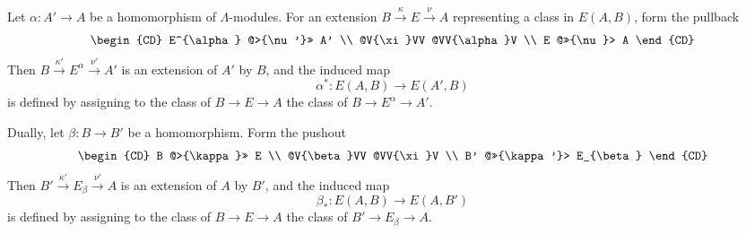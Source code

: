 Let $\alpha: A' \to A$ be a homomorphism of $\Lambda$-modules. For an extension $B \xrightarrow{\kappa} E \xrightarrow{\nu} A$ representing a class in $E(A,B)$, form the pullback
$$
\begin{CD}
E^{\alpha} @>{\nu'}>> A' \\
@V{\xi}VV @VV{\alpha}V \\
E @>>{\nu}> A
\end{CD}
$$
Then $B \xrightarrow{\kappa'} E^{\alpha} \xrightarrow{\nu'} A'$ is an extension of $A'$ by $B$, and the induced map
$$
\alpha^*: E(A,B) \to E(A',B)
$$
is defined by assigning to the class of $B \to E \to A$ the class of $B \to E^{\alpha} \to A'$.

Dually, let $\beta: B \to B'$ be a homomorphism. Form the pushout
$$
\begin{CD}
B @>{\kappa}>> E \\
@V{\beta}VV @VV{\xi}V \\
B' @>>{\kappa'}> E_{\beta}
\end{CD}
$$
Then $B' \xrightarrow{\kappa'} E_{\beta} \xrightarrow{\nu'} A$ is an extension of $A$ by $B'$, and the induced map
$$
\beta_*: E(A,B) \to E(A,B')
$$
is defined by assigning to the class of $B \to E \to A$ the class of $B' \to E_{\beta} \to A$.

